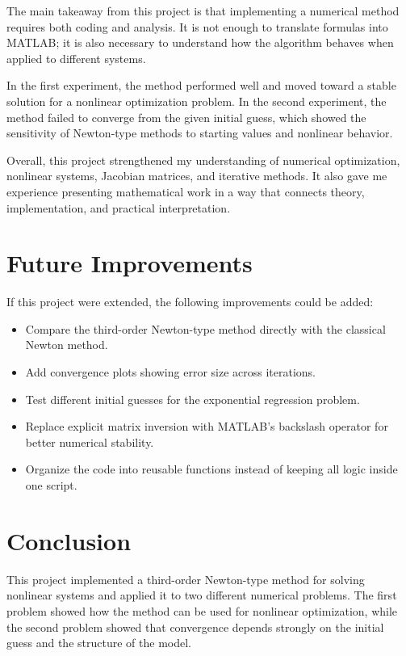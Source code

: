 \documentclass[11pt]{article}
\begin{document}
The main takeaway from this project is that implementing a numerical method requires both coding and analysis. It is not enough to translate formulas into MATLAB; it is also necessary to understand how the algorithm behaves when applied to different systems.

In the first experiment, the method performed well and moved toward a stable solution for a nonlinear optimization problem. In the second experiment, the method failed to converge from the given initial guess, which showed the sensitivity of Newton-type methods to starting values and nonlinear behavior.

Overall, this project strengthened my understanding of numerical optimization, nonlinear systems, Jacobian matrices, and iterative methods. It also gave me experience presenting mathematical work in a way that connects theory, implementation, and practical interpretation.

\section{Future Improvements}

If this project were extended, the following improvements could be added:

\begin{itemize}[leftmargin=*]
    \item Compare the third-order Newton-type method directly with the classical Newton method.
    \item Add convergence plots showing error size across iterations.
    \item Test different initial guesses for the exponential regression problem.
    \item Replace explicit matrix inversion with MATLAB's backslash operator for better numerical stability.
    \item Organize the code into reusable functions instead of keeping all logic inside one script.
\end{itemize}

\section{Conclusion}

This project implemented a third-order Newton-type method for solving nonlinear systems and applied it to two different numerical problems. The first problem showed how the method can be used for nonlinear optimization, while the second problem showed that convergence depends strongly on the initial guess and the structure of the model.
\end{document}
